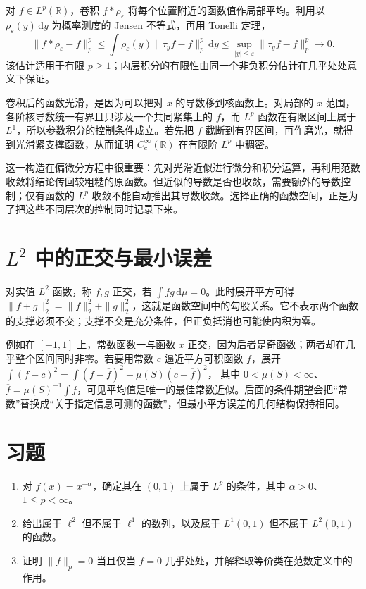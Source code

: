 \documentclass[UTF8,12pt,a4paper,fontset=fandol]{ctexbook}
\begin{document}
对 $f\in L^p(\mathbb R)$，卷积 $f*\rho_\varepsilon$ 将每个位置附近的函数值作局部平均。利用以 $\rho_\varepsilon(y)\,\mathrm dy$ 为概率测度的 Jensen 不等式，再用 Tonelli 定理，
\[
 \|f*\rho_\varepsilon-f\|_p^p
 \leq\int\rho_\varepsilon(y)\|\tau_yf-f\|_p^p\,\mathrm dy
 \leq\sup_{|y|\leq\varepsilon}\|\tau_yf-f\|_p^p\longrightarrow0.
\]
该估计适用于有限 $p\geq1$；内层积分的有限性由同一个非负积分估计在几乎处处意义下保证。

卷积后的函数光滑，是因为可以把对 $x$ 的导数移到核函数上。对局部的 $x$ 范围，各阶核导数统一有界且只涉及一个共同紧集上的 $f$，而 $L^p$ 函数在有限区间上属于 $L^1$，所以参数积分的控制条件成立。若先把 $f$ 截断到有界区间，再作磨光，就得到光滑紧支撑函数，从而证明 $C_c^\infty(\mathbb R)$ 在有限阶 $L^p$ 中稠密。

这一构造在偏微分方程中很重要：先对光滑近似进行微分和积分运算，再利用范数收敛将结论传回较粗糙的原函数。但近似的导数是否也收敛，需要额外的导数控制；仅有函数的 $L^p$ 收敛不能自动推出其导数收敛。选择正确的函数空间，正是为了把这些不同层次的控制同时记录下来。

\section{$L^2$ 中的正交与最小误差}
对实值 $L^2$ 函数，称 $f,g$ 正交，若 $\int fg\,\mathrm d\mu=0$。此时展开平方可得
$\|f+g\|_2^2=\|f\|_2^2+\|g\|_2^2$，这就是函数空间中的勾股关系。它不表示两个函数的支撑必须不交；支撑不交是充分条件，但正负抵消也可能使内积为零。

例如在 $[-1,1]$ 上，常数函数一与函数 $x$ 正交，因为后者是奇函数；两者却在几乎整个区间同时非零。若要用常数 $c$ 逼近平方可积函数 $f$，展开
$\int(f-c)^2=\int(f-\overline f)^2+\mu(S)(c-\overline f)^2$，
其中 $0<\mu(S)<\infty$、$\overline f=\mu(S)^{-1}\int f$，可见平均值是唯一的最佳常数近似。后面的条件期望会把“常数”替换成“关于指定信息可测的函数”，但最小平方误差的几何结构保持相同。

\section{习题}
\begin{enumerate}
 \item 对 $f(x)=x^{-\alpha}$，确定其在 $(0,1)$ 上属于 $L^p$ 的条件，其中 $\alpha>0$、$1\leq p<\infty$。
 \item 给出属于 $\ell^2$ 但不属于 $\ell^1$ 的数列，以及属于 $L^1(0,1)$ 但不属于 $L^2(0,1)$ 的函数。
 \item 证明 $\|f\|_p=0$ 当且仅当 $f=0$ 几乎处处，并解释取等价类在范数定义中的作用。
\end{enumerate}
\end{document}
